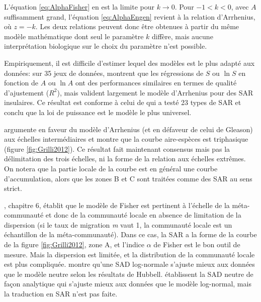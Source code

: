 \documentclass[
  11pt,
  french,
  a4paper,
  extrafontsizes,onecolumn,openright
  ]{memoir}
\begin{document}
L'équation \eqref{eq:AlphaFisher} en est la limite pour \(k \to 0\).
Pour \(-1<k<0\), avec \(A\) suffisamment grand, l'équation \eqref{eq:AlphaEngen} revient à la relation d'Arrhenius, où \(z=-k\).
Les deux relations peuvent donc être obtenues à partir du même modèle mathématique dont seul le paramètre \(k\) diffère, mais aucune interprétation biologique sur le choix du paramètre n'est possible.

Empiriquement, il est difficile d'estimer lequel des modèles est le plus adapté aux données: sur 35 jeux de données, \textcite{Connor1979} montrent que les régressions de \(S\) ou \(\ln S\) en fonction de \(A\) ou \(\ln A\) ont des performances similaires en termes de qualité d'ajustement (\(R^2\)), mais \textcite{Triantis2012} valident largement le modèle d'Arrhenius pour des SAR insulaires.
Ce résultat est conforme à celui de \textcite{Dengler2009} qui a testé 23 types de SAR et conclu que la loi de puissance est le modèle le plus universel.

\textcite{Preston1960} argumente en faveur du modèle d'Arrhenius (et en défaveur de celui de Gleason) aux échelles intermédiaires et montre que la courbe aire-espèces est triphasique (figure \ref{fig:Grilli2012}).
Ce résultat fait maintenant consensus mais pas la délimitation des trois échelles, ni la forme de la relation aux échelles extrêmes.
On notera que la partie locale de la courbe est en général une courbe d'accumulation, alors que les zones B et C sont traitées comme des SAR au sens strict.

\textcite{Hubbell2001}, chapitre 6, établit que le modèle de Fisher est pertinent à l'échelle de la méta-communauté et donc de la communauté locale en absence de limitation de la dispersion (si le taux de migration \emph{m} vaut 1, la communauté locale est un échantillon de la méta-communauté).
Dans ce cas, la SAR a la forme de la courbe de la figure \ref{fig:Grilli2012}, zone A, et l'indice \(\alpha\) de Fisher est le bon outil de mesure.
Mais la dispersion est limitée, et la distribution de la communauté locale est plus compliquée.
\textcite{McGill2003} montre qu'une SAD log-normale s'ajuste mieux aux données que le modèle neutre selon les résultats de Hubbell.
\textcite{Volkov2003} établissent la SAD neutre de façon analytique qui s'ajuste mieux aux données que le modèle log-normal, mais la traduction en SAR n'est pas faite.

\scriptsize
\end{document}
